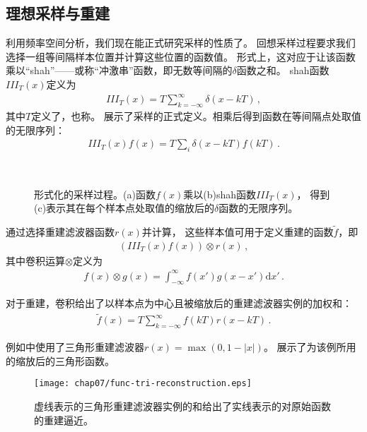\subsection{理想采样与重建}\label{sub:理想采样与重建}
利用频率空间分析，我们现在能正式研究采样的性质了。
回想采样过程要求我们选择一组等间隔样本位置并计算这些位置的函数值。
形式上，这对应于让该函数乘以“shah”——或称“冲激串”函数，即无数等间隔的$\delta$函数之和。
shah函数$III_T(x)$定义为
\begin{align*}
    III_T(x)=T\sum\limits_{k=-\infty}^{\infty}\delta(x-kT)\, ,
\end{align*}
其中$T$定义了，也称。
展示了采样的正式定义。相乘后得到函数在等间隔点处取值的无限序列：
\begin{align*}
    III_T(x)f(x)=T\sum\limits_i\delta(x-kT)f(kT)\, .
\end{align*}
\begin{figure}[htbp]
    \centering
    \,
    \,
    \caption{形式化的采样过程。(a)函数$f(x)$乘以(b)shah函数$III_T(x)$，
    得到(c)表示其在每个样本点处取值的缩放后的$\delta$函数的无限序列。}
    \label{fig:7.4}
\end{figure}

通过选择重建滤波器函数$r(x)$并计算，
这些样本值可用于定义重建的函数$\tilde{f}$，即
\begin{align*}
    (III_T(x)f(x))\otimes r(x)\, ,
\end{align*}
其中卷积运算$\otimes$定义为
\begin{align*}
    f(x)\otimes g(x)=\int_{-\infty}^{\infty}f(x')g(x-x')\mathrm{d}x'\, .
\end{align*}

对于重建，卷积给出了以样本点为中心且被缩放后的重建滤波器实例的加权和：
\begin{align*}
    \tilde{f}(x)=T\sum\limits_{k=-\infty}^{\infty}f(kT)r(x-kT)\, .
\end{align*}

例如中使用了三角形重建滤波器$r(x)=\max(0,1-|x|)$。
展示了为该例所用的缩放后的三角形函数。
\begin{figure}[htbp]
    \centering\texttt{[image: chap07/func-tri-reconstruction.eps]}
    \caption{虚线表示的三角形重建滤波器实例的和给出了实线表示的对原始函数的重建逼近。}
    \label{fig:7.5}
\end{figure}

